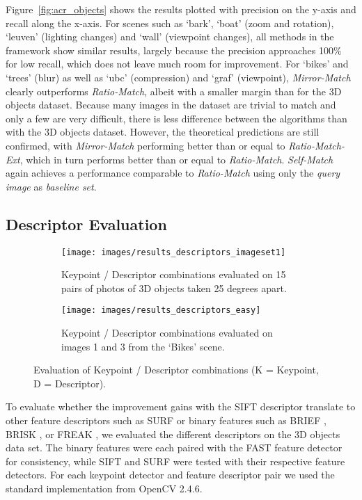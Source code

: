 \documentclass[10pt,journal,cspaper,compsoc]{IEEEtran}
\begin{document}
Figure~\ref{fig:acr_objects} shows the results plotted with precision on 
the y-axis and recall along the x-axis. For scenes such as `bark', `boat' 
(zoom and rotation), `leuven' (lighting changes) and `wall' (viewpoint changes), all methods 
in the framework show similar results, largely because the precision approaches 100\% for low recall, which does not leave much room 
for improvement. For `bikes' and `trees' (blur) as well as `ubc'
(compression) and `graf' (viewpoint), \emph{Mirror-Match} clearly 
outperforms \emph{Ratio-Match}, albeit with a smaller margin than 
for the 3D objects dataset. Because many images in the dataset are 
trivial to match and only a few are very difficult, there is less difference
between the algorithms than with the 3D objects dataset. However, the 
theoretical predictions are still confirmed, with \emph{Mirror-Match} 
performing better than or equal to \emph{Ratio-Match-Ext}, which in turn 
performs better than or equal to \emph{Ratio-Match}. \emph{Self-Match} 
again achieves a performance comparable to \emph{Ratio-Match} using only the \emph{query image} as \emph{baseline 
set}.

\subsection{Descriptor Evaluation}
\label{label:desc}

\begin{figure*}[t!]
    \begin{subfigure}[t]{1\textwidth}
        \centering
        \texttt{[image: images/results\_descriptors\_imageset1]}
		\caption{Keypoint / Descriptor combinations evaluated on 15 
		pairs of photos of 3D objects taken 25 degrees apart.}
        \label{fig:descriptors}
    \end{subfigure}%

    \begin{subfigure}[t]{1\textwidth}
        \centering
        \texttt{[image: images/results\_descriptors\_easy]}
        \caption{Keypoint / Descriptor combinations evaluated on images 1 and 3 from the `Bikes' 
        scene.}
        \label{fig:descriptors_easy}
    \end{subfigure}%
    \caption{Evaluation of Keypoint / Descriptor combinations (K = Keypoint, D = 
Descriptor).}
\end{figure*}

To evaluate whether the improvement gains with the SIFT descriptor 
translate to other feature descriptors such as SURF \cite{bay2006surf} 
or binary features such as BRIEF \cite{calonder2010brief}, BRISK 
\cite{leutenegger2011brisk}, or FREAK \cite{alahi2012freak}, we evaluated 
the different descriptors on the 3D objects data set.  The binary 
features were each paired with the FAST feature detector for 
consistency, while SIFT and SURF were tested with their respective 
feature detectors.  For each keypoint detector and feature descriptor 
pair we used the standard implementation from OpenCV 2.4.6.
\end{document}
